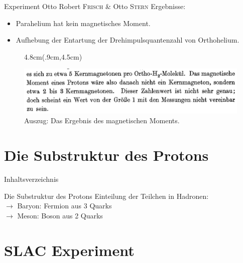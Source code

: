 \documentclass[t,9pt]{beamer}
\newcommand{\highlight}[3]{ \begin{textblock*}{#1}(#2,#3) \begin{tcolorbox} [enhanced,opacityfill=.1,colback=blue] \end{tcolorbox} \end{textblock*} } %
\begin{document}
        \begin{frame}{Experiment Otto Robert \textsc{Frisch} \& Otto \textsc{Stern}\cite{FrischStern1933}}
                Ergebnisse:
                \begin{itemize}
                        \item Parahelium hat kein magnetisches Moment.
                                \pause
                        \item Aufhebung der Entartung der Drehimpulsquantenzahl von Orthohelium.
                \end{itemize}
                \pause
                \begin{figure}
                        \highlight{4.8cm}{.9cm}{4.5cm}
                        \includegraphics[width=.9\textwidth]{prosi_mag_moment_proton_nicht_1.png}
                        \caption{Auszug: Das Ergebnis des magnetischen Moments.\cite{FrischStern1933}}
                \end{figure}
        \end{frame}

        \section{Die Substruktur des Protons}

        \begin{frame}{Inhaltsverzeichnis}
                \tableofcontents[currentsection]
        \end{frame}

        \begin{frame}{Die Substruktur des Protons}
                Einteilung der Teilchen in Hadronen: %
                \\\vspace{.1cm} $\rightarrow $ Baryon: Fermion aus 3 Quarks
                \\ $\rightarrow $ Meson: Boson aus 2 Quarks
        \end{frame}

        \section{SLAC Experiment}
\end{document}
